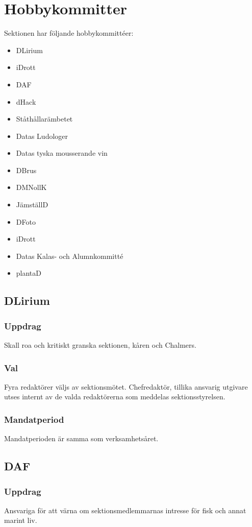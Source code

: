 \section{Hobbykommitter}
Sektionen har följande hobbykommittéer:
\begin{itemize}
  \item DLirium
  \item iDrott 
  \item DAF 
  \item dHack
  \item Ståthållarämbetet
  \item Datas Ludologer 
  \item Datas tyska mousserande vin
  \item DBrus
  \item DMNollK
  \item JämställD
  \item DFoto
  \item iDrott
  \item Datas Kalas- och Alumnkommitté
  \item plantaD
\end{itemize}
\subsection{DLirium}
\subsubsection{Uppdrag}
Skall roa och kritiskt granska sektionen, kåren och Chalmers. 
\subsubsection{Val}
Fyra redaktörer väljs av sektionsmötet. Chefredaktör, tillika ansvarig utgivare utses internt av de valda redaktörerna som meddelas sektionsstyrelsen. 
\subsubsection{Mandatperiod}
Mandatperioden är samma som verksamhetsåret. 

\subsection{DAF}
\subsubsection{Uppdrag}
Ansvariga för att värna om sektionsmedlemmarnas intresse för fisk och
annat marint liv.

